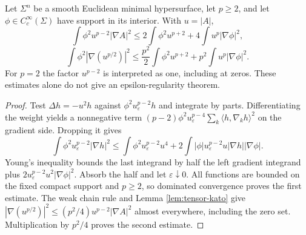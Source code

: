 \begin{proposition}\label{prop:curvature-caccioppoli}
Let $\Sigma^n$ be a smooth Euclidean minimal hypersurface, let $p\geq2$, and let $\phi\in C_c^\infty(\Sigma)$ have support in its interior. With $u=|A|$,
\[
 \int\phi^2u^{p-2}|\nabla A|^2
 \leq2\int\phi^2u^{p+2}+4\int u^p|\nabla\phi|^2,
\]
\[
 \int\phi^2|\nabla(u^{p/2})|^2
 \leq\frac{p^2}{2}\int\phi^2u^{p+2}+p^2\int u^p|\nabla\phi|^2.
\]
For $p=2$ the factor $u^{p-2}$ is interpreted as one, including at zeros. These estimates alone do not give an epsilon-regularity theorem.
\end{proposition}
\begin{proof}
Test $\Delta h=-u^2h$ against $\phi^2u_\varepsilon^{p-2}h$ and integrate by parts. Differentiating the weight yields a nonnegative term
$(p-2)\phi^2u_\varepsilon^{p-4}\sum_k\langle h,\nabla_kh\rangle^2$ on the gradient side. Dropping it gives
\[
 \int\phi^2u_\varepsilon^{p-2}|\nabla h|^2
 \leq\int\phi^2u_\varepsilon^{p-2}u^4
 +2\int |\phi|u_\varepsilon^{p-2}u|\nabla h||\nabla\phi|.
\]
Young's inequality bounds the last integrand by half the left gradient integrand plus $2u_\varepsilon^{p-2}u^2|\nabla\phi|^2$. Absorb the half and let $\varepsilon\downarrow0$. All functions are bounded on the fixed compact support and $p\geq2$, so dominated convergence proves the first estimate. The weak chain rule and Lemma \ref{lem:tensor-kato} give $|\nabla(u^{p/2})|^2\leq(p^2/4)u^{p-2}|\nabla A|^2$ almost everywhere, including the zero set. Multiplication by $p^2/4$ proves the second estimate.
\end{proof}
